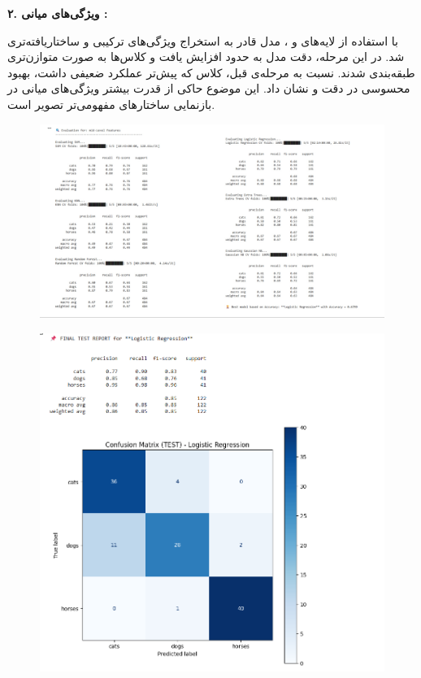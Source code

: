 \documentclass[a4paper,12pt]{article}
\begin{document}
\textbf{۲. ویژگی‌های میانی :}

با استفاده از لایه‌های  و ، مدل قادر به استخراج ویژگی‌های ترکیبی و ساختاریافته‌تری شد. در این مرحله، دقت مدل  به حدود  افزایش یافت و کلاس‌ها به صورت متوازن‌تری طبقه‌بندی شدند. نسبت به مرحله‌ی قبل، کلاس  که پیش‌تر عملکرد ضعیفی داشت، بهبود محسوسی در دقت و  نشان داد. این موضوع حاکی از قدرت بیشتر ویژگی‌های میانی در بازنمایی ساختارهای مفهومی‌تر تصویر است.

\begin{figure}[h]
	\centering
	\includegraphics[width=1\textwidth]{2-1.jpg}
\end{figure}
\FloatBarrier
\begin{figure}[h]
	\centering
	\includegraphics[width=1\textwidth]{2-2.png}
\end{figure}
\FloatBarrier
\end{document}
